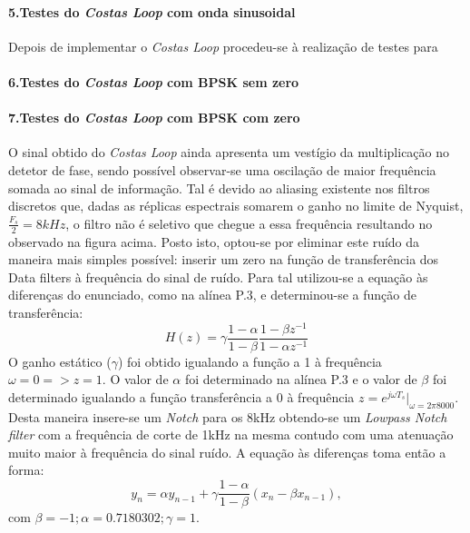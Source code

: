 \documentclass[11pt]{article}
\numberwithin{equation}{section}
\begin{document}
\paragraph{5.Testes do \textit{Costas Loop} com onda sinusoidal} \hspace{0pt}

Depois de implementar o \textit{Costas Loop} procedeu-se à realização de testes para 

\paragraph{6.Testes do \textit{Costas Loop} com BPSK sem zero}

\paragraph{7.Testes do \textit{Costas Loop} com BPSK com zero} \hspace{0pt}

O sinal obtido do \textit{Costas Loop} ainda apresenta um vestígio da multiplicação no detetor de fase, sendo possível observar-se uma oscilação de maior frequência somada ao sinal de informação. Tal é devido ao aliasing existente nos filtros discretos que, dadas as réplicas espectrais somarem o ganho no limite de Nyquist, $\frac{F_s}{2} = 8kHz$, o filtro  não é seletivo que chegue a essa frequência resultando no observado na figura acima. Posto isto, optou-se por eliminar este ruído da maneira mais simples possível: inserir um zero na função de transferência dos Data filters à frequência do sinal de ruído. Para tal utilizou-se a equação às diferenças do enunciado, como na alínea P.3, e determinou-se a função de transferência:
\begin{equation}
H(z) = \gamma\frac{1-\alpha}{1-\beta}\dfrac{1-\beta z^{-1}}{1-\alpha z^{-1}}
\end{equation}
O ganho estático ($\gamma$) foi obtido igualando a função a 1 à frequência $\omega=0 => z=1$. O valor de $\alpha$ foi determinado na alínea P.3 e o valor de $\beta$ foi determinado igualando a função transferência a 0 à frequência $z=e^{j\omega T_s}|_{\omega=2\pi8000}$. Desta maneira insere-se um \textit{Notch} para os 8kHz obtendo-se um \textit{Lowpass Notch filter} com a frequência de corte de 1kHz na mesma contudo com uma atenuação muito maior à frequência do sinal ruído.
A equação às diferenças toma então a forma:
\begin{equation}
y_n = \alpha y_{n-1}+\gamma\frac{1-\alpha}{1-\beta}(x_n-\beta x_{n-1}), 
\end{equation}
com $\beta=-1; \alpha=0.7180302; \gamma=1.$
\end{document}

